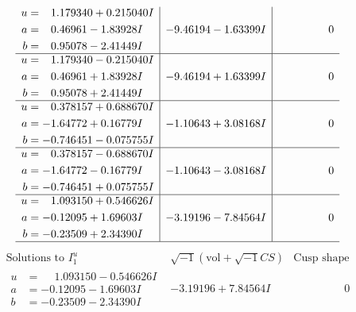 \documentclass[1p]{elsarticle_modified}
\theoremstyle{definition}
\newcommand{\I}{\sqrt{-1}}
\begin{document}
$$\begin{array}{c|c|c}
\begin{aligned}
u &= \phantom{-}1.179340 + 0.215040 I \\
a &= \phantom{-}0.46961 - 1.83928 I \\
b &= \phantom{-}0.95078 - 2.41449 I\end{aligned}
 & -9.46194 - 1.63399 I & \phantom{-0.000000 } 0 \\ \hline\begin{aligned}
u &= \phantom{-}1.179340 - 0.215040 I \\
a &= \phantom{-}0.46961 + 1.83928 I \\
b &= \phantom{-}0.95078 + 2.41449 I\end{aligned}
 & -9.46194 + 1.63399 I & \phantom{-0.000000 } 0 \\ \hline\begin{aligned}
u &= \phantom{-}0.378157 + 0.688670 I \\
a &= -1.64772 + 0.16779 I \\
b &= -0.746451 - 0.075755 I\end{aligned}
 & -1.10643 + 3.08168 I & \phantom{-0.000000 } 0 \\ \hline\begin{aligned}
u &= \phantom{-}0.378157 - 0.688670 I \\
a &= -1.64772 - 0.16779 I \\
b &= -0.746451 + 0.075755 I\end{aligned}
 & -1.10643 - 3.08168 I & \phantom{-0.000000 } 0 \\ \hline\begin{aligned}
u &= \phantom{-}1.093150 + 0.546626 I \\
a &= -0.12095 + 1.69603 I \\
b &= -0.23509 + 2.34390 I\end{aligned}
 & -3.19196 - 7.84564 I & \phantom{-0.000000 } 0\\
 \hline 
 \end{array}$$\newpage$$\begin{array}{c|c|c}  
\text{Solutions to }I^u_{1}& \I (\text{vol} + \sqrt{-1}CS) & \text{Cusp shape}\\
 \hline 
\begin{aligned}
u &= \phantom{-}1.093150 - 0.546626 I \\
a &= -0.12095 - 1.69603 I \\
b &= -0.23509 - 2.34390 I\end{aligned}
 & -3.19196 + 7.84564 I & \phantom{-0.000000 } 0 \\ \hline\begin{aligned}

\end{aligned}
\end{array}$$
\end{document}
